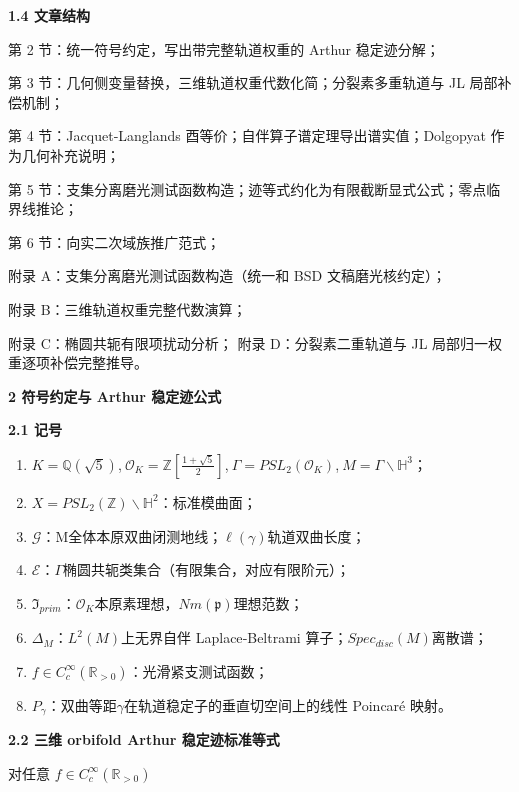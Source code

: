 \documentclass[11pt,a4paper]{ctexart}
\begin{document}
\textbf{1.4 文章结构}

第 2 节：统一符号约定，写出带完整轨道权重的 Arthur 稳定迹分解；

第 3 节：几何侧变量替换，三维轨道权重代数化简；分裂素多重轨道与 JL
局部补偿机制；

第 4 节：Jacquet‑Langlands 酉等价；自伴算子谱定理导出谱实值；Dolgopyat
作为几何补充说明；

第 5
节：支集分离磨光测试函数构造；迹等式约化为有限截断显式公式；零点临界线推论；

第 6 节：向实二次域族推广范式；

附录 A：支集分离磨光测试函数构造（统一和 BSD 文稿磨光核约定）；

附录 B：三维轨道权重完整代数演算；

附录 C：椭圆共轭有限项扰动分析； 附录 D：分裂素二重轨道与 JL
局部归一权重逐项补偿完整推导。

\textbf{2 符号约定与 Arthur 稳定迹公式}

\textbf{2.1 记号}

\begin{enumerate}
\def\labelenumi{\arabic{enumi}.}
\item
  \(K = \mathbb{Q}\left( \sqrt{5} \right)\),\(\ \mathcal{O}_{K} = \mathbb{Z}\left\lbrack \frac{1 + \sqrt{5}}{2} \right\rbrack\),\(\ \Gamma = {PSL}_{2}\left( \mathcal{O}_{K} \right)\),\(\ M = \Gamma\backslash\mathbb{H}^{3}\)；
\item
  \(X = {PSL}_{2}\left( \mathbb{Z} \right)\backslash\mathbb{H}^{2}\)：标准模曲面；
\item
  \(\mathcal{G}\)：M全体本原双曲闭测地线；\(\ell\left(\gamma\right)\)轨道双曲长度；
\item
  \(\mathcal{E}\)：\(\Gamma\)椭圆共轭类集合（有限集合，对应有限阶元）；
\item
  \(\mathfrak{I}_{prim}\)：\(\mathcal{O}_{K}\)本原素理想，\(Nm\left( \mathfrak{p} \right)\)理想范数；
\item
  \(\Delta_{M}\)：\(L^{2}(M)\)上无界自伴 Laplace‑Beltrami
  算子；\(Spec_{disc}(M)\)离散谱；
\item
  \(f \in C_{c}^{\infty}\left( \mathbb{R}_{> 0} \right)\)：光滑紧支测试函数；
\item
  \(P_{\gamma}\)：双曲等距\(\gamma\)在轨道稳定子的垂直切空间上的线性
  Poincaré 映射。
\end{enumerate}

\textbf{2.2 三维 orbifold Arthur 稳定迹标准等式}

对任意 \(f \in C_{c}^{\infty}\left( \mathbb{R}_{> 0} \right)\)
\end{document}
